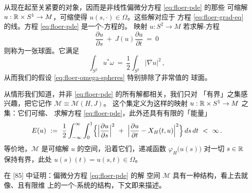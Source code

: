 从现在起至关紧要的对象，因而是非线性偏微分方程 \eqref{eq:floer-pde} 的那些%
可缩解 $u:\mathbb{R}\times S^{1}\to M$，可缩使得 $u(s,\cdot)\in\Omega$。这些解对应于%
\trGradient{}方程 \eqref{eq:floer-grad-eq} 的\trFlow{}线。方程%
\eqref{eq:floer-pde} 是一个\trCauchy-\trRiemann{}方程的\trPerturbation。%
\trSmooth{}映射 $u:S^{2}\to M$ 若求解\trCauchy-\trRiemann{}方程
\begin{equation}\label{eq:floer-holo-sphere}
\frac{\partial u}{\partial s}\ +\ J(u)\frac{\partial u}{\partial t}\ =\ 0
\end{equation}
则称为一张\trHolomorphic{}球面。它满足
\begin{equation}\label{eq:floer-sphere-area}
\int_{S^{2}}u^{*}\omega\ =\ \frac{1}{2}\int_{S^{2}}\bigl|\nabla u\bigr|^{2}\,,
\end{equation}
从而我们的假设 \eqref{eq:floer-omega-spheres} 特别排除了非常值的%
\trHolomorphic{}球面。

从\trTorus{}情形我们知道，并非 \eqref{eq:floer-pde} 的所有解都相关，我们只对%
「有界\trOrbit」之集感兴趣，把它记作 $\mathcal{M}\equiv\mathcal{M}(H,J)$。%
这个集定义为这样的\trSmooth{}映射 $u:\mathbb{R}\times S^{1}\to M$ 之集：它们可缩、%
求解方程 \eqref{eq:floer-pde}，此外还具有有限的「能量」
\begin{equation}\label{eq:floer-energy}
E(u)\ :=\ \frac{1}{2}\int_{-\infty}^{\infty}\int_{0}^{1}\Bigl\{\Bigl|\frac{\partial u}{\partial s}\Bigr|^{2}\ +\ \Bigl|\frac{\partial u}{\partial t}-X_{H}(t,u)\Bigr|^{2}\Bigr\}\,ds\,dt\ <\ \infty\,.
\end{equation}
等价地，$\mathcal{M}$ 是可缩解 $u$ 的空间，沿着它们，递减函数%
$\varphi_{H}\bigl(u(s)\bigr)$ 对一切 $s\in\mathbb{R}$ 保持有界，此处%
$u(s)(t)=u(s,t)\in\Omega$。

\trFloer{}在 [85] 中证明：偏微分方程 \eqref{eq:floer-pde} 的\trBounded{}解%
空间 $\mathcal{M}$ 具有一种结构，看上去就像\trSmooth、\trCompact{}且有限维%
\trManifold{}上的一个\trMorse-\trSmale{}系统的结构，下文即来描述。

